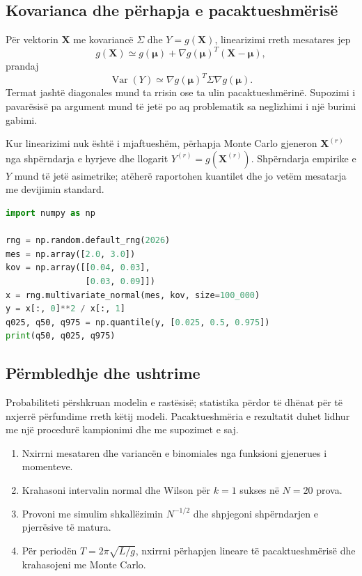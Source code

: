 \documentclass[11pt,oneside,openany]{book}
\newcommand{\vect}[1]{\bm{#1}}
\newcommand{\Var}{\operatorname{Var}}
\begin{document}
\subsection{Kovarianca dhe përhapja e pacaktueshmërisë}
Për vektorin $\vect X$ me kovariancë $\Sigma$ dhe $Y=g(\vect X)$, linearizimi rreth mesatares jep
\begin{equation}
 g(\vect X)\simeq g(\vect\mu)+\nabla g(\vect\mu)^T(\vect X-\vect\mu),
\end{equation}
prandaj
\begin{equation}
 \Var(Y)\simeq\nabla g(\vect\mu)^T\Sigma\nabla g(\vect\mu).
\end{equation}
Termat jashtë diagonales mund ta rrisin ose ta ulin pacaktueshmërinë. Supozimi i pavarësisë pa argument mund të jetë po aq problematik sa neglizhimi i një burimi gabimi.

Kur linearizimi nuk është i mjaftueshëm, përhapja Monte Carlo gjeneron $\vect X^{(r)}$ nga shpërndarja e hyrjeve dhe llogarit $Y^{(r)}=g(\vect X^{(r)})$. Shpërndarja empirike e $Y$ mund të jetë asimetrike; atëherë raportohen kuantilet dhe jo vetëm mesatarja me devijimin standard.

\begin{lstlisting}[language=Python,caption={Përhapje Monte Carlo e hyrjeve të korreluara.}]
import numpy as np

rng = np.random.default_rng(2026)
mes = np.array([2.0, 3.0])
kov = np.array([[0.04, 0.03],
                [0.03, 0.09]])
x = rng.multivariate_normal(mes, kov, size=100_000)
y = x[:, 0]**2 / x[:, 1]
q025, q50, q975 = np.quantile(y, [0.025, 0.5, 0.975])
print(q50, q025, q975)
\end{lstlisting}

\subsection{Përmbledhje dhe ushtrime}
Probabiliteti përshkruan modelin e rastësisë; statistika përdor të dhënat për të nxjerrë përfundime rreth këtij modeli. Pacaktueshmëria e rezultatit duhet lidhur me një procedurë kampionimi dhe me supozimet e saj.
\begin{enumerate}
\item Nxirrni mesataren dhe variancën e binomiales nga funksioni gjenerues i momenteve.
\item Krahasoni intervalin normal dhe Wilson për $k=1$ sukses në $N=20$ prova.
\item Provoni me simulim shkallëzimin $N^{-1/2}$ dhe shpjegoni shpërndarjen e pjerrësive të matura.
\item Për periodën $T=2\pi\sqrt{L/g}$, nxirrni përhapjen lineare të pacaktueshmërisë dhe krahasojeni me Monte Carlo.
\end{enumerate}
\end{document}
